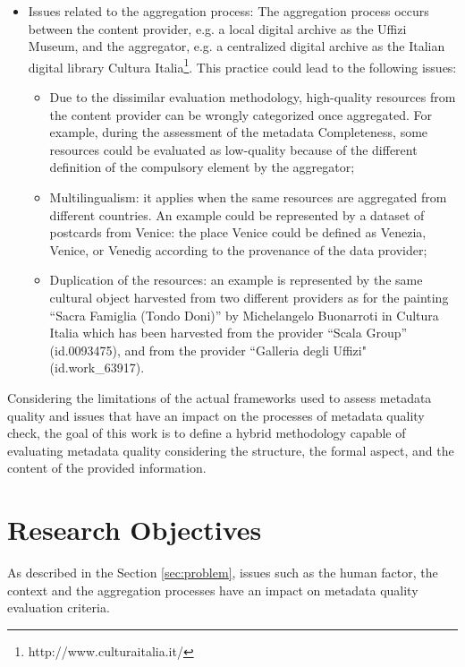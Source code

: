 \documentclass[epsfig,a4paper,12pt,titlepage]{book}
\begin{document}
\begin{itemize}
    \item Issues related to the aggregation process: The aggregation process occurs between the content provider, e.g. a local digital archive as the Uffizi Museum, and the aggregator, e.g. a centralized digital archive as the Italian digital library Cultura Italia\footnote{http://www.culturaitalia.it/}. This practice could lead to the following issues:
    \begin{itemize}
        \item Due to the dissimilar evaluation methodology, high-quality resources from the content provider can be wrongly categorized once aggregated. For example, during the assessment of the metadata Completeness, some resources could be evaluated as low-quality because of the different definition of the compulsory element by the aggregator; 
        \item Multilingualism: it applies when the same resources are aggregated from different countries. An example could be represented by a dataset of postcards from Venice: the place Venice could be defined as Venezia, Venice, or Venedig according to the provenance of the data provider;
        \item Duplication of the resources: an example is represented by the same cultural object harvested from two different providers as for the painting ``Sacra Famiglia (Tondo Doni)'' by Michelangelo Buonarroti in Cultura Italia which has been harvested from the provider ``Scala Group'' (id.0093475), and from the provider ``Galleria degli Uffizi" (id.work\_63917).   
    \end{itemize}
\end{itemize}
  
Considering the limitations of the actual frameworks used to assess metadata quality and issues that have an impact on the processes of metadata quality check, the goal of this work is to define a hybrid methodology capable of evaluating metadata quality considering the structure, the formal aspect, and the content of the provided information.  
\section{Research Objectives}
\label{sec:solution}

As described in the Section \ref{sec:problem}, issues such as the human factor, the context and the aggregation processes have an impact on metadata quality evaluation criteria. 
\end{document}

